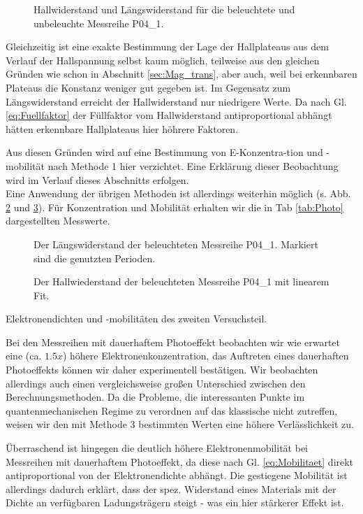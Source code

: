 \begin{figure}[h!]
	\centering
	
	\caption{Hallwiderstand und Längswiderstand für die beleuchtete und unbeleuchte Messreihe P04\_1.}
	\label{abb:P04_Compare}
\end{figure}
Gleichzeitig ist eine exakte Bestimmung der Lage der Hallplateaus aus dem Verlauf der Hallspannung selbst kaum möglich, teilweise aus den gleichen Gründen wie schon in Abschnitt \ref{sec:Mag_trans}, aber auch, weil bei erkennbaren Plateaus die Konstanz weniger gut gegeben ist. Im Gegensatz zum Längswiderstand erreicht der Hallwiderstand nur niedrigere Werte. Da nach Gl. \ref{eq:Fuellfaktor} der Füllfaktor vom Hallwiderstand antiproportional abhängt hätten erkennbare Hallplateaus hier höhrere Faktoren.
 
Aus diesen Gründen wird auf eine Bestimmung von E-Konzentra-tion und -mobilität nach Methode 1 hier verzichtet. Eine Erklärung dieser Beobachtung wird im Verlauf dieses Abschnitts erfolgen. \\

Eine Anwendung der übrigen Methoden ist allerdings weiterhin möglich (s. Abb. \ref{abb:P04_Meth_2} und \ref{abb:P04_Meth_3}).
Für Konzentration und Mobilität erhalten wir die in Tab \ref{tab:Photo} dargestellten Messwerte. \\


\begin{figure}[h!]
	\centering
	
	\caption{Der Längswiderstand der beleuchteten Messreihe P04\_1. Markiert sind die genutzten Perioden.}
	\label{abb:P04_Meth_2}
\end{figure}

\begin{figure}[h!]
	\centering
	
	\caption{Der Hallwiederstand der beleuchteten Messreihe P04\_1 mit linearem Fit.}
	\label{abb:P04_Meth_3}
\end{figure}

\begin{table}[h!]
	\centering
	\caption{Elektronendichten und -mobilitäten des zweiten Versuchsteil.}
	
	\label{tab:Photo}
\end{table}
Bei den Messreihen mit dauerhaftem Photoeffekt beobachten wir wie erwartet eine (ca. $1.5x$) höhere Elektronenkonzentration, das Auftreten eines dauerhaften Photoeffekts können wir daher experimentell bestätigen. Wir beobachten allerdings auch einen vergleichsweise großen Unterschied zwischen den Berechnungsmethoden. Da die Probleme, die interessanten Punkte im quantenmechanischen Regime zu verordnen auf das klassische nicht zutreffen, weisen wir den mit Methode 3 bestimmten Werten eine höhere Verlässlichkeit zu. 

Überraschend ist hingegen die deutlich höhere Elektronenmobilität bei Messreihen mit dauerhaftem Photoeffekt, da diese nach Gl. \ref{eq:Mobilitaet} direkt antiproportional von der Elektronendichte abhängt. Die gestiegene Mobilität ist allerdings dadurch erklärt, dass der spez. Widerstand eines Materials mit der Dichte an verfügbaren Ladungsträgern steigt - was ein hier stärkerer Effekt ist.
